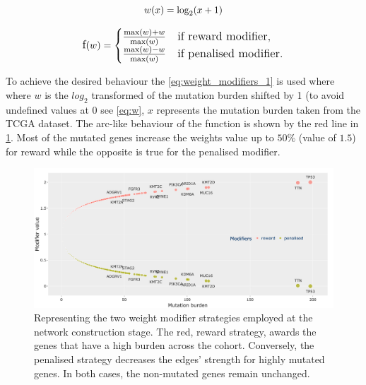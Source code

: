 \begin{equation} \label{eq:w}
    \large{
    w(x) = \log_2(x+1)
    }
\end{equation}

\begin{equation} \label{eq:weight_modifiers_1}
    \large{
    \text{f}(w) = 
    \begin{cases} 
    \frac{\max(w) + w}{\max(w)} & \text{if reward modifier}, \\
    \frac{\max(w) - w}{\max(w)} & \text{if penalised modifier}.
    \end{cases}
    }
\end{equation}

To achieve the desired behaviour the \cref{eq:weight_modifiers_1} is used where where $w$ is the $log_2$ transformed of the mutation burden shifted by 1 (to avoid undefined values at 0 see \cref{eq:w}, $x$ represents the mutation burden taken from the TCGA dataset.  The arc-like behaviour of the function is shown by the red line in \cref{fig:N_I:modifiers}. Most of the mutated genes increase the weights value up to $50\%$ (value of $1.5$) for reward while the opposite is true for the penalised modifier. 



\begin{figure}[!htb]    
    \centering
    \includegraphics[width=1.0\textwidth,keepaspectratio]{Sections/Network_I/Resources/Methods/modifiers.png}
    \caption[Reward v1 vs Penalised edge weight modifiers]{Representing the two weight modifier strategies employed at the network construction stage. The red, reward strategy, awards the genes that have a high burden across the cohort. Conversely, the  penalised strategy decreases the edges' strength for highly mutated genes. In both cases, the non-mutated genes remain unchanged.}
    \label{fig:N_I:modifiers}
\end{figure}

